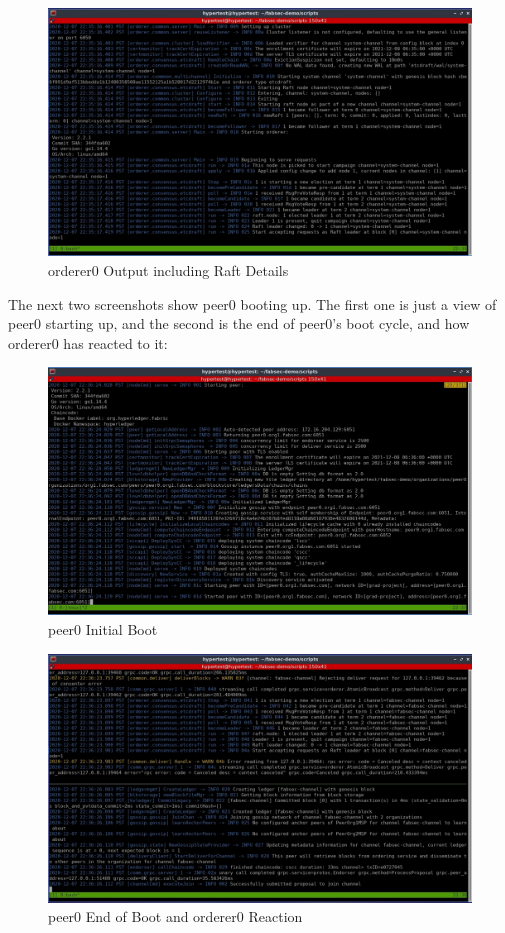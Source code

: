 		\begin{figure}[H]
		\includegraphics[width=\textwidth]{./fabsec-report-network-flow/network-flow-5.jpg}
		\caption{orderer0 Output including Raft Details}
		\end{figure}
		
	\newpage
	\hspace{10mm}The next two screenshots show peer0 booting up. The first one is just a view of peer0 starting up, and the second is the end of peer0's boot cycle, and how orderer0 has reacted to it:
	
		\begin{figure}[H]
		\includegraphics[width=.8\textwidth]{./fabsec-report-network-flow/network-flow-6.jpg}
		\centering
		\caption{peer0 Initial Boot}
		\end{figure}
		
		\begin{figure}[H]
		\includegraphics[width=.8\textwidth]{./fabsec-report-network-flow/network-flow-7.jpg}
		\centering
		\caption{peer0 End of Boot and orderer0 Reaction}
		\end{figure}
		
